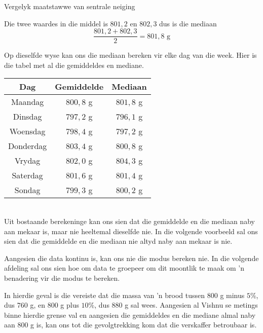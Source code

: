 \begin{wex}{
Vergelyk maatstawwe van sentrale neiging
}
{  Die twee waardes in die middel is $801,2$ en $802,3$ dus is die mediaan
  \begin{equation*}
    \frac{801,2 + 802,3}{2} = 801,8\mbox{ g}
  \end{equation*}

  Op dieselfde wyse kan ons die mediaan bereken vir elke dag van die week. Hier is die tabel met al die gemiddeldes en mediane. 
\\
  \begin{center}
    \begin{tabular}{|c|c|c|} \hline
      \textbf{Dag} & \textbf{Gemiddelde} &\textbf{Mediaan} \\  \hline
      Maandag & $800,8$ g & $801,8$ g \\ \hline
      Dinsdag & $797,2$ g & $796,1$ g \\ \hline
      Woensdag & $798,4$ g & $797,2$ g \\ \hline
      Donderdag & $803,4$ g & $800,8$ g \\ \hline
      Vrydag & $802,0$ g & $804,3$ g \\ \hline
      Saterdag & $801,6$ g & $801,4$ g \\ \hline
      Sondag & $799,3$ g & $800,2$ g \\ \hline
    \end{tabular}
  \end{center}
\vspace{8pt}\\
  Uit bostaande berekeninge kan ons sien dat die gemiddelde en die mediaan naby aan mekaar is, maar nie heeltemal dieselfde nie. In die volgende voorbeeld sal ons sien dat die gemiddelde en die mediaan nie altyd naby aan mekaar is nie.


  Aangesien die data kontinu is, kan ons nie die modus bereken nie. In die volgende afdeling sal ons sien hoe om data te groepeer om dit moontlik te maak om ’n benadering vir die modus te bereken.


  In hierdie geval is die vereiste dat die massa van ’n brood tussen $800$ g minus $5$\%, dus $760$ g, en $800$ g plus 
  $10$\%, dus $880$ g sal wees. Aangesien al Vishnu se metings binne hierdie grense val en aangesien die gemiddeldes en die mediane almal naby aan $800$ g is, kan ons tot die gevolgtrekking kom dat die verskaffer betroubaar is.
}
\end{wex}

